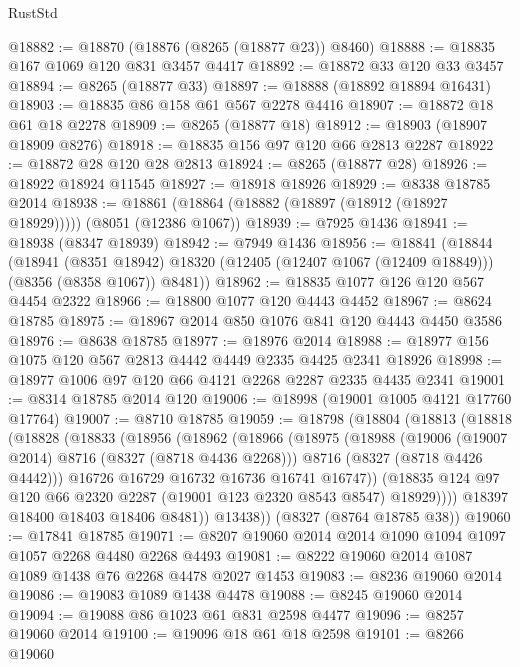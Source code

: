 \begin{lexlean}{RustStd}
\begin{coremodule}
@18882 := @18870 (@18876 (@8265 (@18877 @23)) @8460)
@18888 := @18835 @167 @1069 @120 @831 @3457 @4417
@18892 := @18872 @33 @120 @33 @3457
@18894 := @8265 (@18877 @33)
@18897 := @18888 (@18892 @18894 @16431)
@18903 := @18835 @86 @158 @61 @567 @2278 @4416
@18907 := @18872 @18 @61 @18 @2278
@18909 := @8265 (@18877 @18)
@18912 := @18903 (@18907 @18909 @8276)
@18918 := @18835 @156 @97 @120 @66 @2813 @2287
@18922 := @18872 @28 @120 @28 @2813
@18924 := @8265 (@18877 @28)
@18926 := @18922 @18924 @11545
@18927 := @18918 @18926
@18929 := @8338 @18785 @2014
@18938 := @18861 (@18864 (@18882 (@18897 (@18912 (@18927 @18929))))) (@8051 (@12386 @1067))
@18939 := @7925 @1436
@18941 := @18938 (@8347 @18939)
@18942 := @7949 @1436
@18956 := @18841
    (@18844
      (@18941
        (@8351 @18942)
        @18320
        (@12405 (@12407 @1067 (@12409 @18849)))
        (@8356 (@8358 @1067))
        @8481))
@18962 := @18835 @1077 @126 @120 @567 @4454 @2322
@18966 := @18800 @1077 @120 @4443 @4452
@18967 := @8624 @18785
@18975 := @18967 @2014 @850 @1076 @841 @120 @4443 @4450 @3586
@18976 := @8638 @18785
@18977 := @18976 @2014
@18988 := @18977 @156 @1075 @120 @567 @2813 @4442 @4449 @2335 @4425 @2341 @18926
@18998 := @18977 @1006 @97 @120 @66 @4121 @2268 @2287 @2335 @4435 @2341
@19001 := @8314 @18785 @2014 @120
@19006 := @18998 (@19001 @1005 @4121 @17760 @17764)
@19007 := @8710 @18785
@19059 := @18798
    (@18804
      (@18813
        (@18818
          (@18828
            (@18833
              (@18956
                (@18962
                  (@18966
                    (@18975
                      (@18988
                        (@19006 (@19007 @2014) @8716 (@8327 (@8718 @4436 @2268)))
                        @8716
                        (@8327 (@8718 @4426 @4442)))
                      @16726
                      @16729
                      @16732
                      @16736
                      @16741
                      @16747))
                  (@18835 @124 @97 @120 @66 @2320 @2287 (@19001 @123 @2320 @8543 @8547) @18929))))
            @18397
            @18400
            @18403
            @18406
            @8481))
        @13438))
    (@8327 (@8764 @18785 @38))
@19060 := @17841 @18785
@19071 := @8207 @19060 @2014 @2014 @1090 @1094 @1097 @1057 @2268 @4480 @2268 @4493
@19081 := @8222 @19060 @2014 @1087 @1089 @1438 @76 @2268 @4478 @2027 @1453
@19083 := @8236 @19060 @2014
@19086 := @19083 @1089 @1438 @4478
@19088 := @8245 @19060 @2014
@19094 := @19088 @86 @1023 @61 @831 @2598 @4477
@19096 := @8257 @19060 @2014
@19100 := @19096 @18 @61 @18 @2598
@19101 := @8266 @19060

\end{coremodule}
\end{lexlean}
